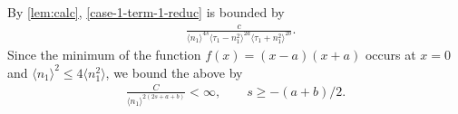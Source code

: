 \documentclass[12pt,reqno]{amsart}
\numberwithin{equation}{section}  %
\numberwithin{figure}{section}
\theoremstyle{plain}
\theoremstyle{definition}
\theoremstyle{remark}
\begin{document}
%
By \autoref{lem:calc}, \eqref{case-1-term-1-reduc} is bounded by
%
%
\begin{equation*}
\begin{split}
  & \frac{c}{\langle n_{1} \rangle ^{4s} \langle \tau_{1} - n_{1}^{2} \rangle
  ^{2a}
  \langle \tau_{1} + n_{1}^{2} \rangle
  ^{2b}} .
\end{split}
\end{equation*}
%
Since the minimum of the function $f(x) = (x-a)(x+a)$ occurs at $x = 0$ and
$\langle n_{1} \rangle ^{2} \le 4\langle n_{1}^{2} \rangle  $, we
bound the above by 
%
%
\begin{equation*}
\begin{split}
  \frac{C}{\langle n_{1} \rangle ^{2(2s + a + b)}} < \infty, \qquad s \ge
  -(a + b)/2.
\end{split}
\end{equation*}
%
\end{document}
